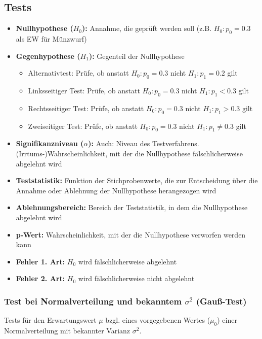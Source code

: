 \subsection{Tests}

\begin{itemize}
    \item \textbf{Nullhypothese (\(H_0\)):} Annahme, die geprüft werden soll (z.B. \(H_0: p_0=0.3\) als EW für Münzwurf)
    \item \textbf{Gegenhypothese (\(H_1\)):} Gegenteil der Nullhypothese
        \begin{itemize}
            \item Alternativtest: Prüfe, ob anstatt \(H_0: p_0=0.3\) nicht \(H_1: p_1=0.2\) gilt
            \item Linksseitiger Test: Prüfe, ob anstatt \(H_0: p_0=0.3\) nicht \(H_1: p_1<0.3\) gilt
            \item Rechtsseitiger Test: Prüfe, ob anstatt \(H_0: p_0=0.3\) nicht \(H_1: p_1>0.3\) gilt
            \item Zweiseitiger Test: Prüfe, ob anstatt \(H_0: p_0=0.3\) nicht \(H_1: p_1\neq0.3\) gilt
        \end{itemize}
    \item \textbf{Signifikanzniveau (\(\alpha\)):} Auch: Niveau des Testverfahrens. (Irrtums-)Wahrscheinlichkeit, mit der die Nullhypothese fälschlicherweise abgelehnt wird
    \item \textbf{Teststatistik:} Funktion der Stichprobenwerte, die zur Entscheidung über die Annahme oder Ablehnung der Nullhypothese herangezogen wird
    \item \textbf{Ablehnungsbereich:} Bereich der Teststatistik, in dem die Nullhypothese abgelehnt wird
    \item \textbf{p-Wert:} Wahrscheinlichkeit, mit der die Nullhypothese verworfen werden kann
    \item \textbf{Fehler 1. Art:} \(H_0\) wird fälschlicherweise abgelehnt
    \item \textbf{Fehler 2. Art:} \(H_0\) wird fälschlicherweise nicht abgelehnt
\end{itemize}


\subsubsection{Test bei Normalverteilung und bekanntem \(\sigma^2\) (Gauß-Test)}

Tests für den Erwartungswert \(\mu\) bzgl. eines vorgegebenen Wertes (\(\mu_0\)) einer Normalverteilung mit bekannter Varianz \(\sigma^2\).\\

